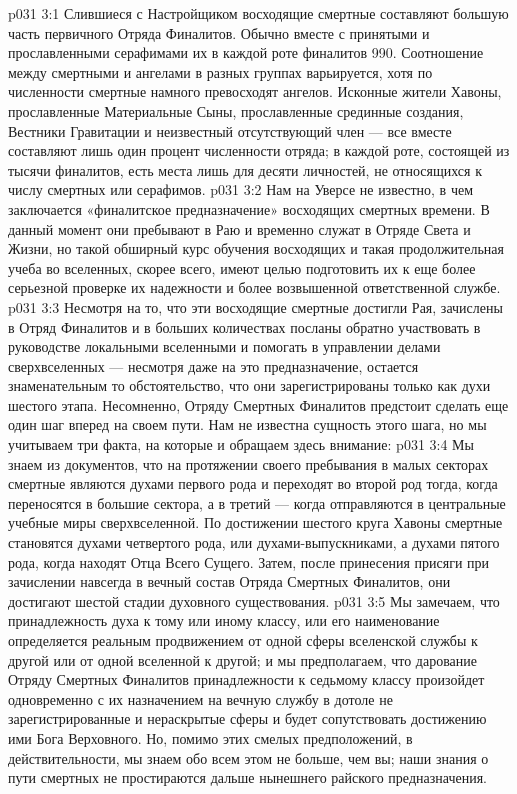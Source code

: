 \vs p031 3:1 Слившиеся с Настройщиком восходящие смертные составляют большую часть первичного Отряда Финалитов. Обычно вместе с принятыми и прославленными серафимами их в каждой роте финалитов 990. Соотношение между смертными и ангелами в разных группах варьируется, хотя по численности смертные намного превосходят ангелов. Исконные жители Хавоны, прославленные Материальные Сыны, прославленные срединные создания, Вестники Гравитации и неизвестный отсутствующий член --- все вместе составляют лишь один процент численности отряда; в каждой роте, состоящей из тысячи финалитов, есть места лишь для десяти личностей, не относящихся к числу смертных или серафимов.
\vs p031 3:2 Нам на Уверсе не известно, в чем заключается «финалитское предназначение» восходящих смертных времени. В данный момент они пребывают в Раю и временно служат в Отряде Света и Жизни, но такой обширный курс обучения восходящих и такая продолжительная учеба во вселенных, скорее всего, имеют целью подготовить их к еще более серьезной проверке их надежности и более возвышенной ответственной службе.
\vs p031 3:3 \pc Несмотря на то, что эти восходящие смертные достигли Рая, зачислены в Отряд Финалитов и в больших количествах посланы обратно участвовать в руководстве локальными вселенными и помогать в управлении делами сверхвселенных --- несмотря даже на это  предназначение, остается знаменательным то обстоятельство, что они зарегистрированы только как духи шестого этапа. Несомненно, Отряду Смертных Финалитов предстоит сделать еще один шаг вперед на своем пути. Нам не известна сущность этого шага, но мы учитываем три факта, на которые и обращаем здесь внимание:
\vs p031 3:4 \bibnobreakspace Мы знаем из документов, что на протяжении своего пребывания в малых секторах смертные являются духами первого рода и переходят во второй род тогда, когда переносятся в большие сектора, а в третий --- когда отправляются в центральные учебные миры сверхвселенной. По достижении шестого круга Хавоны смертные становятся духами четвертого рода, или духами\hyp{}выпускниками, а духами пятого рода, когда находят Отца Всего Сущего. Затем, после принесения присяги при зачислении навсегда в вечный состав Отряда Смертных Финалитов, они достигают шестой стадии духовного существования.
\vs p031 3:5 Мы замечаем, что принадлежность духа к тому или иному классу, или его наименование определяется реальным продвижением от одной сферы вселенской службы к другой или от одной вселенной к другой; и мы предполагаем, что дарование Отряду Смертных Финалитов принадлежности к седьмому классу произойдет одновременно с их назначением на вечную службу в дотоле не зарегистрированные и нераскрытые сферы и будет сопутствовать достижению ими Бога Верховного. Но, помимо этих смелых предположений, в действительности, мы знаем обо всем этом не больше, чем вы; наши знания о пути смертных не простираются дальше нынешнего райского предназначения.
